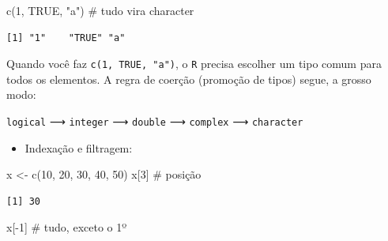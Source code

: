 \documentclass[
  letterpaper,
  DIV=11,
  numbers=noendperiod]{scrreprt}
\newenvironment{Shaded}{\begin{snugshade}}{\end{snugshade}}
\newcommand{\CommentTok}[1]{\textcolor[rgb]{0.37,0.37,0.37}{#1}}
\newcommand{\ConstantTok}[1]{\textcolor[rgb]{0.56,0.35,0.01}{#1}}
\newcommand{\DecValTok}[1]{\textcolor[rgb]{0.68,0.00,0.00}{#1}}
\newcommand{\FunctionTok}[1]{\textcolor[rgb]{0.28,0.35,0.67}{#1}}
\newcommand{\NormalTok}[1]{\textcolor[rgb]{0.00,0.23,0.31}{#1}}
\newcommand{\OtherTok}[1]{\textcolor[rgb]{0.00,0.23,0.31}{#1}}
\newcommand{\SpecialCharTok}[1]{\textcolor[rgb]{0.37,0.37,0.37}{#1}}
\newcommand{\StringTok}[1]{\textcolor[rgb]{0.13,0.47,0.30}{#1}}
\providecommand{\tightlist}{%
  \setlength{\itemsep}{0pt}\setlength{\parskip}{0pt}}\usepackage{longtable,booktabs,array}
\begin{document}
\begin{Shaded}
\begin{Highlighting}[]
\FunctionTok{c}\NormalTok{(}\DecValTok{1}\NormalTok{, }\ConstantTok{TRUE}\NormalTok{, }\StringTok{"a"}\NormalTok{) }\CommentTok{\# tudo vira character}
\end{Highlighting}
\end{Shaded}

\begin{verbatim}
[1] "1"    "TRUE" "a"   
\end{verbatim}

\begin{tcolorbox}[enhanced jigsaw, left=2mm, toprule=.15mm, opacityback=0, title=\textcolor{quarto-callout-warning-color}{\faExclamationTriangle}\hspace{0.5em}{Aviso}, leftrule=.75mm, breakable, colbacktitle=quarto-callout-warning-color!10!white, coltitle=black, rightrule=.15mm, bottomtitle=1mm, toptitle=1mm, colframe=quarto-callout-warning-color-frame, colback=white, opacitybacktitle=0.6, bottomrule=.15mm, arc=.35mm, titlerule=0mm]

Quando você faz \texttt{c(1,\ TRUE,\ "a")}, o \texttt{R} precisa
escolher um tipo comum para todos os elementos. A regra de coerção
(promoção de tipos) segue, a grosso modo:

\texttt{logical} ⟶ \texttt{integer} ⟶ \texttt{double} ⟶ \texttt{complex}
⟶ \texttt{character}

\end{tcolorbox}

\begin{itemize}
\tightlist
\item
  Indexação e filtragem:
\end{itemize}

\begin{Shaded}
\begin{Highlighting}[]
\NormalTok{x }\OtherTok{\textless{}{-}} \FunctionTok{c}\NormalTok{(}\DecValTok{10}\NormalTok{, }\DecValTok{20}\NormalTok{, }\DecValTok{30}\NormalTok{, }\DecValTok{40}\NormalTok{, }\DecValTok{50}\NormalTok{)}
\NormalTok{x[}\DecValTok{3}\NormalTok{]             }\CommentTok{\# posição}
\end{Highlighting}
\end{Shaded}

\begin{verbatim}
[1] 30
\end{verbatim}

\begin{Shaded}
\begin{Highlighting}[]
\NormalTok{x[}\SpecialCharTok{{-}}\DecValTok{1}\NormalTok{]            }\CommentTok{\# tudo, exceto o 1º}
\end{Highlighting}
\end{Shaded}
\end{document}
